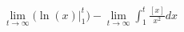 \documentclass[preview]{standalone}
\begin{document}
\begin{align*}
\lim_{t\to\infty} \bigg(\ln(x)\bigg|_{1}^{t}\bigg)- \lim_{t\to\infty}\int_{1}^{t}\frac{[x]}{x^2}dx
\end{align*}
\end{document}
